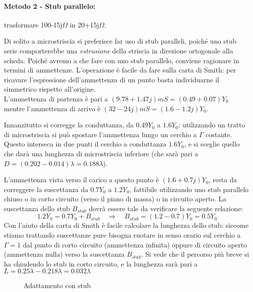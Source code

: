 
\paragraph{Metodo 2 - Stub parallelo:}
trasformare 100-15j$\Omega$ in 20+15j$\Omega$.

Di solito a microstriscia si preferisce far uso di stub paralleli, poiché uno stub serie comporterebbe una \textit{estrusione} della striscia in direzione ortogonale alla scheda. Poiché avremo a che fare con uno stub parallelo, conviene ragionare in termini di ammettenze. L'operazione è facile da fare sulla carta di Smith: per ricavare l'espressione dell'ammettenza di un punto basta individuarne il simmetrico rispetto all'origine.\\
L'ammettenza di partenza è pari a $(9.78 +1.47j) mS=(0.49+0.07)Y_0$ mentre l'ammettenza di arrivo è $(32-24j) mS=(1.6-1.2j)Y_0$.

Innanzitutto si corregge la conduttanza, da $0.49 Y_0$ a $1.6 Y_0$: utilizzando un tratto di microstriscia si può spostare l'ammettenza lungo un cerchio a $\Gamma$ costante. Questo interseca in due punti il cerchio a conduttanza $1.6 Y_0$, e si sceglie quello che darà una lunghezza di microstriscia inferiore (che sarà pari a $D=(0.202-0.014)\lambda=0.188\lambda$).

L'ammettenza vista verso il carico a questo punto è $(1.6+0.7j)Y_0$, resta da correggere la suscettanza da $0.7Y_0$ a $1.2Y_0$, fattibile utilizzando uno stub parallelo chiuso o in corto circuito (verso il piano di massa) o in circuito aperto. La suscettanza dello stub $B_{stub}$ dovrà essere tale da verificare la seguente relazione:
\[
1.2Y_0 = 0.7Y_0 + B_{stub} \quad\Rightarrow\quad
B_{stub} = (1.2-0.7)Y_0 = 0.5 Y_0
\]
Con l'aiuto della carta di Smith è facile calcolare la lunghezza dello stub: siccome stiamo trattando suscettanze pure bisogna ruotare in senso orario sul cerchio a $\Gamma=1$ dal punto di corto circuito (ammettenza infinita) oppure di circuito aperto (ammettenza nulla) verso la suscettanza $B_{stub}$. Si vede che il percorso più breve si ha chiudendo lo stub in corto circuito, e la lunghezza sarà pari a $L=0.25\lambda-0.218\lambda=0.032\lambda$

\begin{figure}[tbh]
	\centering
	\hfill
	\caption{Adattamento con stub}
	\label{fig:adattamento-stub}
\end{figure}


